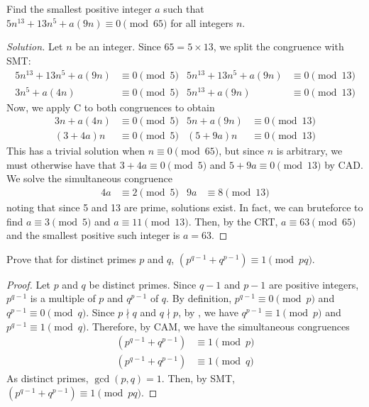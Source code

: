 \question Find the smallest positive integer $a$ such that
$5n^{13}+13n^5+a(9n) \equiv 0 \pmod{65}$ for all integers $n$.
\begin{proof}[Solution]
  Let $n$ be an integer.
  Since $65 = 5 \times 13$, we split the congruence with SMT:
  \begin{align*}
    5n^{13}+13n^5+a(9n) & \equiv 0 \pmod{5} & 5n^{13}+13n^5+a(9n) & \equiv 0 \pmod{13} \\
    3n^5+a(4n)          & \equiv 0 \pmod{5} & 5n^{13}+a(9n)       & \equiv 0 \pmod{13}
  \end{align*}
  Now, we apply C\FLT{} to both congruences to obtain
  \begin{align*}
    3n+a(4n) & \equiv 0 \pmod{5} & 5n+a(9n) & \equiv 0 \pmod{13} \\
    (3+4a)n  & \equiv 0 \pmod{5} & (5+9a)n  & \equiv 0 \pmod{13}
  \end{align*}
  This has a trivial solution when $n \equiv 0 \pmod{65}$, but since $n$ is arbitrary,
  we must otherwise have that $3+4a \equiv 0 \pmod 5$ and $5+9a \equiv 0 \pmod{13}$ by CAD\@.
  We solve the simultaneous congruence
  \begin{align*}
    4a & \equiv 2 \pmod{5} & 9a & \equiv 8 \pmod{13}
  \end{align*}
  noting that since 5 and 13 are prime, solutions exist.
  In fact, we can bruteforce to find $a \equiv 3 \pmod 5$ and $a \equiv 11 \pmod{13}$.
  Then, by the CRT, $a \equiv 63 \pmod{65}$ and the smallest positive such integer is $a = 63$.
\end{proof}


\question Prove that for distinct primes $p$ and $q$,
$\left(p^{q-1} + q^{p-1}\right) \equiv 1 \pmod{pq}$.
\begin{proof}
  Let $p$ and $q$ be distinct primes.
  Since $q-1$ and $p-1$ are positive integers, $p^{q-1}$ is a multiple of $p$ and $q^{p-1}$ of $q$.
  By definition, $p^{q-1} \equiv 0 \pmod p$ and $q^{p-1} \equiv 0 \pmod q$.
  Since $p \nmid q$ and $q \nmid p$, by \FLT, we have
  $q^{p-1} \equiv 1 \pmod p$ and $p^{q-1} \equiv 1 \pmod q$.
  Therefore, by CAM, we have the simultaneous congruences
  \begin{align*}
    \left( p^{q-1} + q^{p-1} \right) & \equiv 1 \pmod p \\
    \left( p^{q-1} + q^{p-1} \right) & \equiv 1 \pmod q
  \end{align*}
  As distinct primes, $\gcd(p,q)=1$.
  Then, by SMT, $\left(p^{q-1} + q^{p-1}\right) \equiv 1 \pmod{pq}$.
\end{proof}


